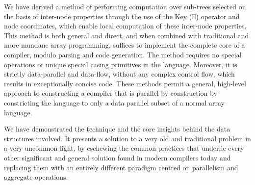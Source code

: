 \documentclass[numbers,preprint]{sigplanconf}
\begin{document}
We have derived a method of performing computation over sub-trees
selected on the basis of inter-node properties through the use of the
Key (⌸) operator and node coordinates, which enable local computation
of these inter-node properties. This method is both general and direct,
and when combined with traditional and more mundane array programming,
suffices to implement the complete core of a compiler, modulo parsing
and code generation. The method requires no special operations or
unique special casing primitives in the language. Moreover, it is
strictly data-parallel and data-flow, without any complex control flow,
which results in exceptionally concise code. These methods permit a 
general, high-level approach to constructing a compiler that is 
parallel by construction by constricting the language to only a data parallel 
subset of a normal array language. 

We have demonstrated the technique and the core insights behind the
data structures involved. It presents a solution to a very old and
traditional problem in a very uncommon light, by eschewing the common
practices that underlie every other significant and general solution
found in modern compilers today and replacing them with an entirely
different paradigm centred on parallelism and aggregate operations.



\end{document}
